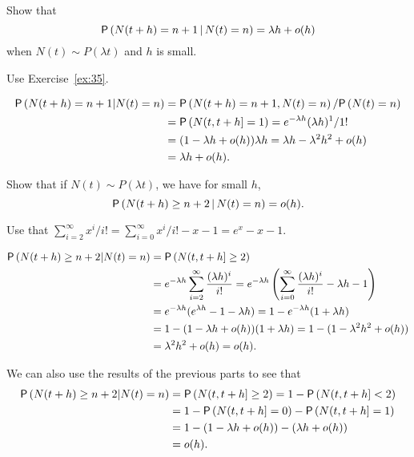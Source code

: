\begin{exercise}{\faFlask}
  Show that
  \begin{equation*}
\P{N(t+h) = n+1 \given N(t) = n} = \lambda h + o(h)
  \end{equation*}
when $N(t) \sim P(\lambda t)$ and $h$ is small. 
  \begin{hint} Use  Exercise~\ref{ex:35}.
    \end{hint}
\begin{solution}
  \begin{align*}
  \P{N(t+h) = n +1 | N(t) = n} 
&=  \P{N(t+h) = n +1 , N(t) =n}/\P{N(t) = n}\\
&= \P{N(t, t+h] = 1} = e^{-\lambda h} (\lambda h)^1/1! \\
&= (1-\lambda h + o(h))\lambda h  = \lambda h - \lambda^2 h^2 + o(h) \\
&= \lambda h + o(h). 
  \end{align*}
\end{solution}
\end{exercise}

\begin{exercise}{\faCalculator}
  Show that if $N(t) \sim P(\lambda t)$, we have for small $h$,
  \begin{equation*}
 \P{N(t+h) \geq n+2 \given N(t) = n} = o(h).
  \end{equation*}
    \begin{hint}
 Use that  $\sum_{i=2}^\infty x^i/i! = \sum_{i=0}^\infty x^i/i! - x -1 = e^x -x - 1$.
    \end{hint}
\begin{solution}
  \begin{align*}
  \P{N(t+h) \geq n+2 | N(t) = n} 
&= \P{N(t, t+h] \geq 2} \\
&= e^{-\lambda h} \sum_{i=2}^\infty \frac{(\lambda h)^i}{i!} 
= e^{-\lambda h} \left(\sum_{i=0}^\infty \frac{(\lambda h)^i}{i!} - \lambda h - 1\right)\\
&= e^{-\lambda h}(e^{\lambda h} - 1 - \lambda h) 
= 1 - e^{-\lambda h}(1 + \lambda h) \\
&= 1 - (1-\lambda h + o(h))(1+\lambda h) 
= 1 - (1-\lambda^2 h^2 + o(h)) \\
&= \lambda^2 h^2 + o(h) = o(h).
  \end{align*}

We can also use the results of the previous parts to see that
\begin{align*}
  \P{N(t+h) \geq n+2 | N(t) = n} 
&= \P{N(t, t+h] \geq 2} = 1- \P{N(t, t+h]<2} \\
&= 1 - \P{N(t, t+h]= 0} - \P{N(t, t+h]=1} \\
&= 1 - (1-\lambda h + o(h) ) - (\lambda h + o(h)) \\
&= o(h).
\end{align*}
\end{solution}
\end{exercise}


